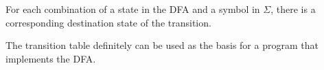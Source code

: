 For each combination of a state in the DFA and a symbol in
$\Sigma$, there is a corresponding destination state of the transition. 


The transition table definitely can be used as the basis for a program that
implements the DFA.



%  
%  
%  
%  
%  
%  
%  
%  
%  
